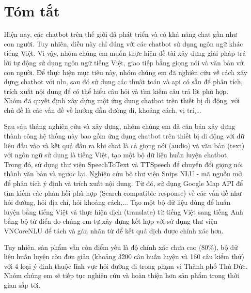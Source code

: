 \chapter*{Tóm tắt}
\label{tomtat}
Hiện nay, các chatbot trên thế giới đã phát triển và có khả năng chat gần như con người. Tuy nhiên, điều này chỉ đúng với các chatbot sử dụng ngôn ngữ khác tiếng Việt. Vì vậy, nhóm chúng em muốn thực hiện đề tài xây dựng giải pháp trả lời tự động sử dụng ngôn ngữ tiếng Việt, giao tiếp bằng giọng nói và văn bản với con người. Để thực hiện mục tiêu này, nhóm chúng em đã nghiên cứu về cách xây dựng chatbot với \ac{nlu}, sau đó sử dụng các thuật toán và \ac{api} có sẵn để phân tích, trích xuất nội dung để có thể hiểu câu hỏi và tìm kiếm câu trả lời phù hợp. Nhóm đã quyết định xây dựng một ứng dụng chatbot trên thiết bị di động, với chủ đề là các vấn đề về hướng dẫn đường đi, khoảng cách, vị trí,...

Sau sáu tháng nghiên cứu và xây dựng, nhóm chúng em đã căn bản xây dựng thành công hệ thống này bao gồm ứng dụng chatbot trên thiết bị di động với dữ liệu đầu vào và kết quả đầu ra khi chat là cả giọng nói (audio) và văn bản (text) với ngôn ngữ sử dụng là tiếng Việt, tạo một bộ dữ liệu huấn luyện chatbot. Trong đó, sử dụng thư viện SpeechToText và TTSpeech để chuyển đổi giọng nói thành văn bản và ngược lại. Nghiên cứu bộ thư viện Snips NLU - mã nguồn mở để phân tích ý định và trích xuất nội dung. Từ đó, sử dụng Google Map API để tìm kiếm các phản hồi phù hợp (Search compatible response) về các vấn đề như hỏi đường, hỏi địa chỉ, hỏi khoảng cách,... Tạo một bộ dữ liệu dùng để huấn luyện bằng tiếng Việt và thực hiện dịch (translate) từ tiếng Việt sang tiếng Anh bằng bộ từ điển do chúng em tự xây dựng kết hợp với sử dụng thư viện VNCoreNLU để tách và gán nhãn từ để kết quả dịch được chính xác hơn.

Tuy nhiên, sản phẩm vẫn còn điểm yếu là độ chính xác chưa cao (80\%), bộ dữ liệu huấn luyện còn đơn giản (khoảng 3200 câu huấn luyện và 160 câu kiểm thử) với 4 loại ý định thuộc lĩnh vực hỏi đường đi trong phạm vi Thành phố Thủ Đức. Nhóm chúng em sẽ tiếp tục nghiên cứu và hoàn thiện hơn sản phẩm trong thời gian sắp tới. 

